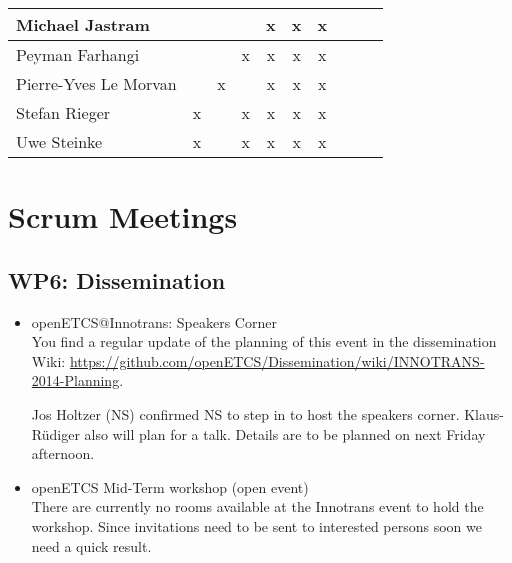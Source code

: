 \documentclass[a4paper, 11pt]{article}
\begin{document}
\begin{tabular}{|l|c|c|c||c|c|c||c|c|c|}
Michael Jastram      &   &   &   & x & x & x \\\hline
Peyman Farhangi      &   &   & x & x & x & x \\\hline
Pierre-Yves Le Morvan&   & x &   & x & x & x \\\hline
Stefan Rieger        & x &   & x & x & x & x \\\hline
Uwe Steinke          & x &   & x & x & x & x \\\hline
\end{tabular}


\section{Scrum Meetings}

\subsection{WP6: Dissemination}

\begin{itemize}
\item openETCS@Innotrans: Speakers Corner\\
You find a regular update of the planning of this event in the dissemination Wiki:
\url{https://github.com/openETCS/Dissemination/wiki/INNOTRANS-2014-Planning}.

Jos Holtzer (NS) confirmed NS to step in to host the speakers corner. Klaus-R\"udiger also will plan for a talk. Details are to be planned on next Friday afternoon.

\item openETCS Mid-Term workshop (open event)\\
There are currently no rooms available at the Innotrans event to hold the workshop. Since invitations need to be sent to interested persons soon we need a quick result.

\end{itemize}
\end{document}
